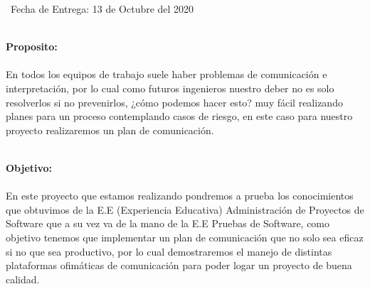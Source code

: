 \documentclass[40pt]{article}
\begin{document}
\maketitle
\textsf{\ Fecha de Entrega: 13 de Octubre del 2020 \\}

\newpage

\maketitle
\textsf{\ \\
\textbf{Proposito:}\\
\\
En todos los equipos de trabajo suele haber problemas de comunicación e interpretación, por lo cual como futuros ingenieros nuestro deber no es solo resolverlos si no prevenirlos, ¿cómo podemos hacer esto? muy fácil realizando planes para un proceso contemplando casos de riesgo, en este caso para nuestro proyecto realizaremos un plan de comunicación. \\}

\maketitle
\textsf{\ \\
\textbf{Objetivo:}\\
\\
En este proyecto que estamos realizando pondremos a prueba los conocimientos que obtuvimos de la E.E (Experiencia Educativa) Administración de Proyectos de Software que a su vez va de la mano de la E.E Pruebas de Software, como objetivo tenemos que implementar un plan de comunicación que no solo sea eficaz si no que sea productivo, por lo cual demostraremos el manejo de distintas plataformas ofimáticas de comunicación para poder logar un proyecto de buena calidad. \\}
\end{document}
